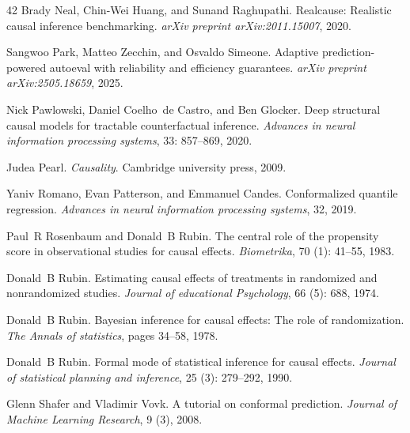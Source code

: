 \documentclass{article}
\theoremstyle{plain}
\theoremstyle{definition}
\theoremstyle{remark}
\begin{document}
\begin{thebibliography}{42}
Brady Neal, Chin-Wei Huang, and Sunand Raghupathi.
\newblock Realcause: Realistic causal inference benchmarking.
\newblock \emph{arXiv preprint arXiv:2011.15007}, 2020.

Sangwoo Park, Matteo Zecchin, and Osvaldo Simeone.
\newblock Adaptive prediction-powered autoeval with reliability and efficiency guarantees.
\newblock \emph{arXiv preprint arXiv:2505.18659}, 2025.

Nick Pawlowski, Daniel Coelho~de Castro, and Ben Glocker.
\newblock Deep structural causal models for tractable counterfactual inference.
\newblock \emph{Advances in neural information processing systems}, 33: 857--869, 2020.

Judea Pearl.
\newblock \emph{Causality}.
\newblock Cambridge university press, 2009.

Yaniv Romano, Evan Patterson, and Emmanuel Candes.
\newblock Conformalized quantile regression.
\newblock \emph{Advances in neural information processing systems}, 32, 2019.

Paul~R Rosenbaum and Donald~B Rubin.
\newblock The central role of the propensity score in observational studies for causal effects.
\newblock \emph{Biometrika}, 70 (1): 41--55, 1983.

Donald~B Rubin.
\newblock Estimating causal effects of treatments in randomized and nonrandomized studies.
\newblock \emph{Journal of educational Psychology}, 66 (5): 688, 1974.

Donald~B Rubin.
\newblock Bayesian inference for causal effects: The role of randomization.
\newblock \emph{The Annals of statistics}, pages 34--58, 1978.

Donald~B Rubin.
\newblock Formal mode of statistical inference for causal effects.
\newblock \emph{Journal of statistical planning and inference}, 25 (3): 279--292, 1990.

Glenn Shafer and Vladimir Vovk.
\newblock A tutorial on conformal prediction.
\newblock \emph{Journal of Machine Learning Research}, 9 (3), 2008.


\end{thebibliography}
\end{document}

